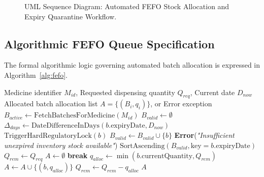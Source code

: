 \begin{figure}[htbp]
\caption{UML Sequence Diagram: Automated FEFO Stock Allocation and Expiry Quarantine Workflow.}
\label{fig:sequence_diagram}
\end{figure}

\subsection{Algorithmic FEFO Queue Specification}
The formal algorithmic logic governing automated batch allocation is expressed in Algorithm~\ref{alg:fefo}.

\begin{algorithm}[htbp]
\caption{Automated First-Expiry-First-Out (FEFO) Batch Allocation Engine}
\label{alg:fefo}
\begin{algorithmic}[1]
\REQUIRE Medicine identifier $M_{id}$, Requested dispensing quantity $Q_{req}$, Current date $D_{now}$
\ENSURE Allocated batch allocation list $A = \{(B_i, q_i)\}$, or Error exception
\STATE $B_{active} \leftarrow \text{FetchBatchesForMedicine}(M_{id})$
\STATE $B_{valid} \leftarrow \emptyset$
        \STATE $\Delta_{days} \leftarrow \text{DateDifferenceInDays}(b.\text{expiryDate}, D_{now})$
            \STATE $\text{TriggerHardRegulatoryLock}(b)$ 
        \ELSE
            \STATE $B_{valid} \leftarrow B_{valid} \cup \{b\}$
        \ENDIF
    \ENDIF
\ENDFOR
{}
    \RETURN \textbf{Error}(\textit{"Insufficient unexpired inventory stock available"})
\ENDIF
\STATE $\text{SortAscending}(B_{valid}, \text{key}=b.\text{expiryDate})$ 
\STATE $Q_{rem} \leftarrow Q_{req}$
\STATE $A \leftarrow \emptyset$
        \STATE \textbf{break}
    \ENDIF
    \STATE $q_{alloc} \leftarrow \min(b.\text{currentQuantity}, Q_{rem})$
    \STATE $A \leftarrow A \cup \{(b, q_{alloc})\}$
    \STATE $Q_{rem} \leftarrow Q_{rem} - q_{alloc}$
\ENDFOR
\RETURN $A$
\end{algorithmic}
\end{algorithm}

